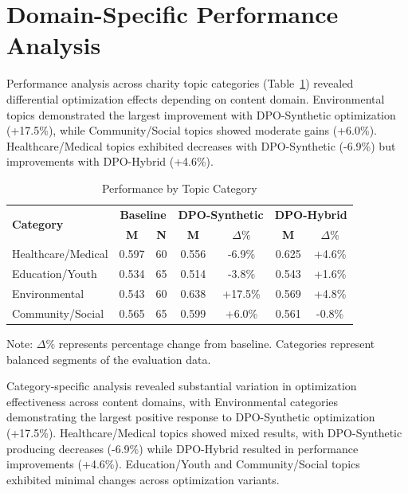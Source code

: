 \section{Domain-Specific Performance Analysis}
\label{sec:category-analysis}

Performance analysis across charity topic categories (Table~\ref{tab:category-analysis}) revealed differential optimization effects depending on content domain. Environmental topics demonstrated the largest improvement with DPO-Synthetic optimization (+17.5\%), while Community/Social topics showed moderate gains (+6.0\%). Healthcare/Medical topics exhibited decreases with DPO-Synthetic (-6.9\%) but improvements with DPO-Hybrid (+4.6\%).

\begin{table}[H]
\centering
\caption{Performance by Topic Category}
\label{tab:category-analysis}
\begin{tabular}{lcccccc}
\toprule
\multirow{2}{*}{\textbf{Category}} & \multicolumn{2}{c}{\textbf{Baseline}} & \multicolumn{2}{c}{\textbf{DPO-Synthetic}} & \multicolumn{2}{c}{\textbf{DPO-Hybrid}} \\
\cmidrule(lr){2-3} \cmidrule(lr){4-5} \cmidrule(lr){6-7}
& \textbf{M} & \textbf{N} & \textbf{M} & \textbf{$\Delta\%$} & \textbf{M} & \textbf{$\Delta\%$} \\
\midrule
Healthcare/Medical & 0.597 & 60 & 0.556 & -6.9\% & 0.625 & +4.6\% \\
Education/Youth & 0.534 & 65 & 0.514 & -3.8\% & 0.543 & +1.6\% \\
Environmental & 0.543 & 60 & 0.638 & +17.5\% & 0.569 & +4.8\% \\
Community/Social & 0.565 & 65 & 0.599 & +6.0\% & 0.561 & -0.8\% \\

\bottomrule
\end{tabular}
\begin{tablenotes}
\small
\item Note: $\Delta\%$ represents percentage change from baseline. Categories represent balanced segments of the evaluation data.
\end{tablenotes}
\end{table}

Category-specific analysis revealed substantial variation in optimization effectiveness across content domains, with Environmental categories demonstrating the largest positive response to DPO-Synthetic optimization (+17.5\%). Healthcare/Medical topics showed mixed results, with DPO-Synthetic producing decreases (-6.9\%) while DPO-Hybrid resulted in performance improvements (+4.6\%). Education/Youth and Community/Social topics exhibited minimal changes across optimization variants.

